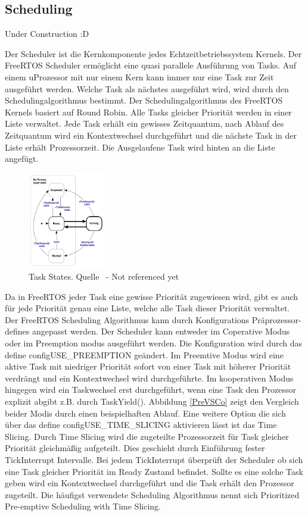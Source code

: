\subsection{Scheduling}
\label{Scheduling}
Under Construction :D

Der Scheduler ist die Kernkomponente jedes Echtzeitbetriebssystem Kernels. Der FreeRTOS Scheduler ermöglicht eine quasi parallele Ausführung von Tasks. Auf einem uProzessor mit nur einem Kern kann immer nur eine Task zur Zeit ausgeführt werden.  Welche Task als nächstes ausgeführt wird, wird durch den Schedulingalgorithmus bestimmt. Der Schedulingalgorithmus des FreeRTOS Kernels basiert auf Round Robin\cite{9783827373427}. Alle Tasks gleicher Priorität werden in einer Liste verwaltet. Jede Task erhält ein gewisses Zeitquantum, nach Ablauf des Zeitquantum wird ein Kontextwechsel durchgeführt und die nächste Task in der Liste erhält Prozessorzeit. Die Ausgelaufene Task wird hinten an die Liste angefügt.

\begin{figure}[ht!]
	\centering
		\includegraphics[width=0.3\textwidth]{Pictures/FreeRTOSOrg/taskStates.png}
	\caption{Task States. Quelle~\protect{} - Not referenced yet}
	\label{fig:TaskStates}
\end{figure}

Da in FreeRTOS jeder Task eine gewisse Priorität zugewiesen wird, gibt es auch für jede Priorität genau eine Liste, welche alle Task dieser Priorität verwaltet. Der FreeRTOS Scheduling Algorithmus kann durch Konfigurations Präprozessor-defines angepasst werden. Der Scheduler kann entweder im Coperative Modus oder im Preemption modus ausgeführt werden. Die Konfiguration wird durch das define configUSE\_PREEMPTION geändert. Im Preemtive Modus wird eine aktive Task mit niedriger Priorität sofort von einer Task mit höherer Priorität verdrängt und ein Kontextwechsel wird durchgeführte. Im kooperativen Modus hingegen wird ein Taskwechsel erst durchgeführt, wenn eine Task den Prozessor explizit abgibt z.B. durch TaskYield(). Abbildung \ref{PreVSCo} zeigt den Vergleich beider Modis durch einen beispielhaften Ablauf. Eine weitere Option die sich über das define configUSE\_TIME\_SLICING aktivieren lässt ist das Time Slicing. Durch Time Slicing wird die zugeteilte Prozessorzeit für Task gleicher Priorität gleichmäßig aufgeteilt. Dies geschieht durch Einführung fester TickInterrupt Intervalle. Bei jedem TickInterrupt überprüft der Scheduler ob sich eine Task gleicher Priorität im Ready Zustand befindet. Sollte es eine solche Task geben wird ein Kontextwechsel durchgeführt und die Task erhält den Prozessor zugeteilt. Die häufigst verwendete Scheduling Algorithmus nennt sich Prioritized Pre-emptive Scheduling with Time Slicing.


